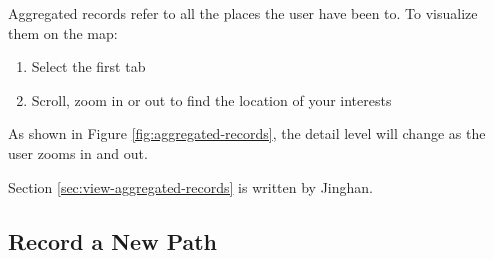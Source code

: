 \documentclass[12pt,a4paper]{article}
\begin{document}
            Aggregated records refer to all the places the user have been to. To visualize them on the map:
            \begin{enumerate}
                \item Select the first tab
                \item Scroll, zoom in or out to find the location of your interests
            \end{enumerate}
            As shown in Figure \ref{fig:aggregated-records}, the detail level will change as the user zooms in and out.
            
            \footnotesize
            Section \ref{sec:view-aggregated-records} is written by Jinghan.
            \normalsize
            
        \subsection{Record a New Path}
            \label{sec:record-new-path}
\end{document}
